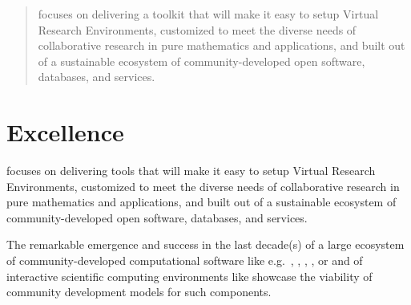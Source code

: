 \documentclass[noworkareas,deliverables,gitinfo,compactht]{euproposal}
\begin{document}
\begin{proposal}[
  site=PS,PSRM=48,
  site=LL,LLRM=48,
  site=UV,UVRM=48,
  site=UJF,UJFRM=48,
  site=UB,UBRM=48,
  site=UO,UORM=48,
  site=USH,USHRM=48,
  site=USO,USORM=48,
  site=SA,SARM=48,
  site=UW,UWRM=48,
  site=JU,JURM=48,
  site=UK,UKRM=48,
  site=US,USRM=48,
  site=ZH,ZHRM=48,
  site=SR,SRRM=48,
  site=UWS,UWSRM=48,
  coordinator=miko,
  acronym={DreamKit},
  acrolong={\underline{D}igital \underline{r}esearch \underline{e}nvironments for \underline{a}* \underline{m}athematics, as a \underline{kit}},
  title=\pn: \protect\pnlong,
  callname=e-Infrastructure for Virtual Research Environment,
  callid=EINFRA-9,
  instrument= H2020 Call 3 Topic 9-2015, 
  challengeid = TODO,
  challenge = TODO,
  objectiveid={TODO}, 
  objective = TODO,
  outcomeid = b1,
  outcome = {More time for Research, not Proposal writing},
  coordinator=thiery,
  months=48,
  compactht]
\newcommand{\TheProject}{\pn}%

\begin{abstract}
  \TheProject focuses on delivering a toolkit that will make it easy
  to setup Virtual Research Environments, customized to meet the
  diverse needs of collaborative research in pure mathematics and
  applications, and built out of a sustainable ecosystem
  of %
  community-developed open software, databases, and services.
\end{abstract}
\tableofcontents




\section{Excellence}

\TheProject focuses on delivering tools that will make it easy to setup Virtual Research
Environments, customized to meet the diverse needs of collaborative
research in pure mathematics and applications, and built out of a
sustainable ecosystem of %
community-developed open software, databases, and services.

The remarkable emergence and success in the last decade(s) of a large
ecosystem of community-developed computational software like
e.g.\ \GAP, \Linbox, \PariGP, \Sage, or \Singular and of interactive
scientific computing environments like \IPython showcase the viability
of community development models for such components.


\end{proposal}
\end{document}

